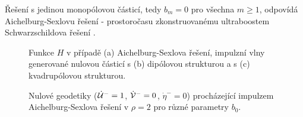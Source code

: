 Řešení s jedinou monopólovou částicí, tedy $b_m=0$ pro všechna $m \geq 1$, odpovídá Aichelburg-Sexlovu řešení - prostoročasu
zkonstruovanému ultraboostem Schwarzschildova řešení \cite{Aichelburg_1971}.

\begin{figure}[h]
    \centering
    \begin{subfigure}[b]{0.31\textwidth}
       \caption{}
    \end{subfigure}
     \hfill
     \begin{subfigure}[b]{0.31\textwidth}
       \caption{}
     \end{subfigure}
     \hfill
     \begin{subfigure}[b]{0.31\textwidth}
       \caption{}
     \end{subfigure}

    \caption{Funkce $H$ v případě (a) Aichelburg-Sexlova řešení, impulzní vlny generované nulovou částicí s (b) dipólovou strukturou a s (c) kvadrupólovou strukturou.}
\end{figure}

\begin{figure}[h]
    \centering
     \caption{Nulové geodetiky ($\dot {\mathcal{U}}^-=1$, $\dot {\mathcal{V}}^-=0$, $\dot \eta^-=0$) procházející impulzem
     Aichelburg-Sexlova řešení v $\rho=2$ pro různé parametry $b_0$.}
     \label{fig:Null_UV_AichelburgSexl_parameters}
\end{figure}

